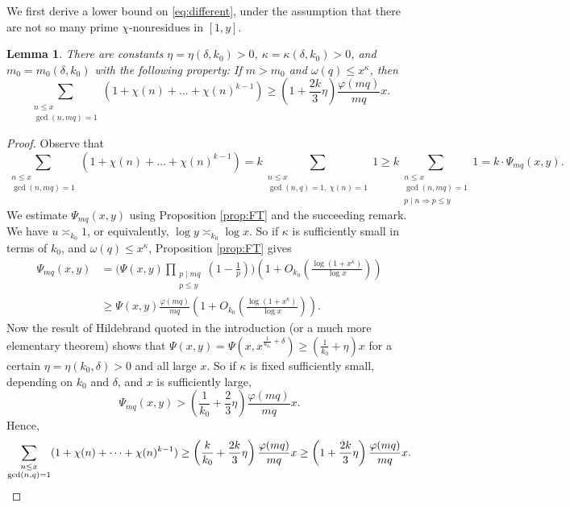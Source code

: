 \documentclass{scrartcl}
\theoremstyle{plain}
\newtheorem{lem}[thm]{Lemma}
\theoremstyle{remark}
\renewcommand{\phi}{\varphi}
\newcommand{\1}{\mathbf{1}}
\begin{document}
We first derive a lower bound on \eqref{eq:different}, under the assumption that there are not so many prime $\chi$-nonresidues in $[1,y]$.

\begin{lem}\label{lem:lower} There are constants $\eta = \eta(\delta,k_0) > 0$, $\kappa =\kappa(\delta,k_0) > 0$, and $m_0 = m_0(\delta,k_0)$ with the following property: If $m > m_0$ and $\omega(q) \le x^{\kappa}$, then
\[ \sum_{\substack{n \le x \\ \gcd(n,mq)=1}} (1+\chi(n) + \dots +\chi(n)^{k-1}) \ge \left(1+\frac{2k}{3}\eta\right) \frac{\phi(mq)}{mq} x. \]
\end{lem}
\begin{proof} Observe that
\[ \sum_{\substack{n \le x \\ \gcd(n,mq)=1}} (1+\chi(n) + \dots + \chi(n)^{k-1}) = k \sum_{\substack{n \le x \\ \gcd(n,q)=1,~\chi(n)=1}} 1  \ge k\sum_{\substack{n \le x\\ \gcd(n,mq)=1 \\ p \mid n \Rightarrow p \le y}} 1 = k \cdot \Psi_{mq}(x,y).\]
We estimate $\Psi_{mq}(x,y)$ using Proposition \ref{prop:FT} and the succeeding remark. We have $u \asymp_{k_0} 1$, or equivalently, $\log y\asymp_{k_0} \log{x}$. So if $\kappa$ is sufficiently small in terms of $k_0$, and $\omega(q) \le x^{\kappa}$, Proposition \ref{prop:FT} gives
\begin{align*} \Psi_{mq}(x,y) &= \bigg(\Psi(x,y)\prod_{\substack{p \mid mq \\ p \le y}}\left(1-\frac{1}{p}\right)\bigg) \left(1+O_{k_0}\left(\frac{\log(1+x^{\kappa})}{\log{x}}\right)\right)\\
&\ge \Psi(x,y) \frac{\phi(mq)}{mq}  \left(1+O_{k_0}\left(\frac{\log(1+x^{\kappa})}{\log{x}}\right)\right).\end{align*}
Now the result of Hildebrand quoted in the introduction (or a much more elementary theorem) shows that $\Psi(x,y) = \Psi(x, x^{\frac{1}{u_{k_0}}+\delta}) \ge (\frac{1}{k_0}+\eta) x$ for a certain $\eta= \eta(k_0,\delta) > 0$ and all large $x$. So if $\kappa$ is fixed sufficiently small, depending on $k_0$ and $\delta$, and $x$ is sufficiently large,
\[ \Psi_{mq}(x,y) > \left(\frac{1}{k_0} + \frac{2}{3}\eta\right) \frac{\phi(mq)}{mq} x. \]
Hence,
\[ \sum_{\substack{n \le x \\ \gcd(n,q)=1}} (1+\chi(n) + \dots + \chi(n)^{k-1}) \ge \left(\frac{k}{k_0} + \frac{2k}{3}\eta\right)\frac{\phi(mq)}{mq} x \ge \left(1+\frac{2k}{3}\eta\right) \frac{\phi(mq)}{mq} x. \qedhere\]
\end{proof}
\end{document}
